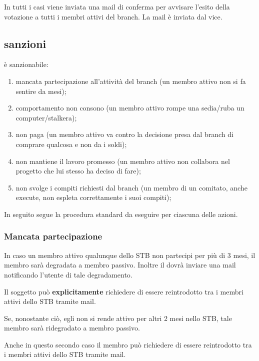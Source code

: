 \documentclass[pdf]{article}
\theoremstyle{definition}
\begin{document}
In tutti i casi viene inviata una mail di conferma per  avvisare l'esito della votazione a tutti i membri attivi del branch. La mail è inviata dal vice.

\subsection{sanzioni}

è sanzionabile:

\begin{enumerate}
	\item mancata partecipazione all'attività del branch (un membro attivo non si fa sentire da mesi);
	\item comportamento non consono (un membro attivo rompe una sedia/ruba un computer/stalkera);
	\item non paga (un membro attivo va contro la decisione presa dal branch di comprare qualcosa e non da i soldi);
	\item non mantiene il lavoro promesso (un membro attivo non collabora nel progetto che lui stesso ha deciso di fare);
	\item non svolge i compiti richiesti dal branch (un membro di un comitato, anche execute, non espleta correttamente i suoi compiti);
\end{enumerate}

In seguito segue la procedura standard da eseguire per ciascuna delle azioni.

\subsubsection{Mancata partecipazione}


In caso un membro attivo qualunque dello STB non partecipi per più di 3 mesi, il membro sarà degradata a membro passivo. Inoltre il  dovrà inviare una mail notificando l'utente di tale degradamento.

Il soggetto può \textbf{explicitamente} richiedere di essere reintrodotto tra i membri attivi dello STB tramite mail.

Se, nonostante ciò, egli non si rende attivo per altri 2 mesi nello STB, tale membro sarà ridegradato a membro passivo.

Anche in questo secondo caso il membro può richiedere di essere reintrodotto tra i membri attivi dello STB tramite mail.
\end{document}
